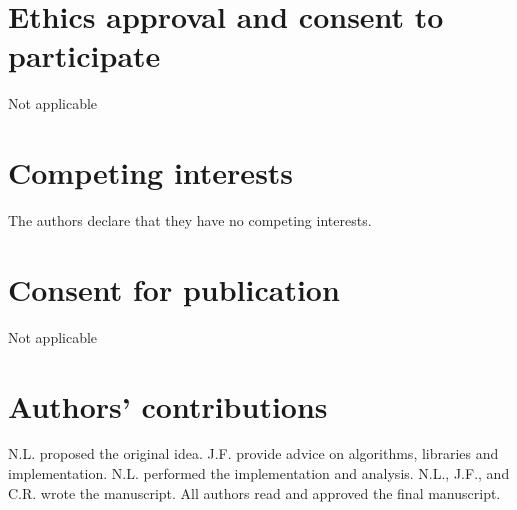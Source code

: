 \section*{Ethics approval and consent to participate}%
Not applicable

\section*{Competing interests}
The authors declare that they have no competing interests.

\section*{Consent for publication}%
Not applicable

\section*{Authors' contributions}
N.L. proposed the original idea. 
J.F. provide advice on algorithms, libraries and implementation.
N.L. performed the implementation and analysis. 
N.L., J.F., and C.R. wrote the manuscript.
All authors read and approved the final manuscript.
